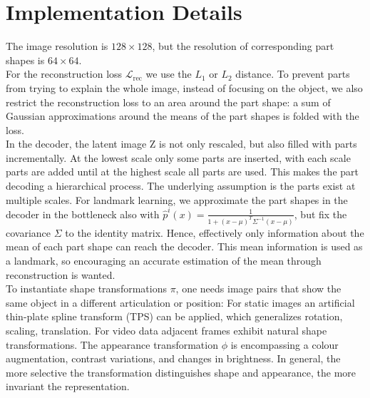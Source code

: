 	\section{Implementation Details}\label{implementationdetails}
		The image resolution is $128 \times 128$, but the resolution of corresponding part shapes is $ 64 \times 64$. \\
		For the reconstruction  loss $\mathcal{L}_\text{rec}$ we use the $L_1$ or $L_2$ distance. To prevent parts from trying to explain the whole image, instead of focusing on the object, we also restrict the reconstruction loss to an area around the part shape: a sum of Gaussian approximations around the means of the part shapes is folded with the loss.\\
		In the decoder, the latent image Z is not only rescaled, but also filled with parts incrementally. At the lowest scale only some parts are inserted, with each scale parts are added until at the highest scale all parts are used. This makes the part decoding a hierarchical process. The underlying assumption is the parts exist at multiple scales.
		For landmark learning, we approximate the part shapes in the decoder in the bottleneck also with $\hat p^i(x) = \frac{1}{1 + (x -\mu)^T \Sigma^{-1} (x - \mu)}$, but fix the covariance $\Sigma$ to the identity matrix. Hence, effectively only information about the mean of each part shape can reach the decoder. This mean information is used as a landmark, so encouraging an accurate estimation of the mean through reconstruction is wanted.\\
		To instantiate shape transformations $\pi$, one needs image pairs that show the same object in a different articulation or position: For static images an artificial thin-plate spline transform (TPS) can be applied, which generalizes rotation, scaling, translation. For video data adjacent frames exhibit natural shape transformations. The appearance transformation $\phi$ is encompassing a colour augmentation, contrast variations, and changes in brightness. In general, the more selective the transformation distinguishes shape and appearance, the more invariant the representation.
